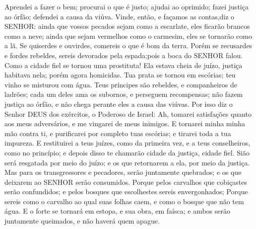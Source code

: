 {  Aprendei a fazer o bem; procurai o que é justo; ajudai ao oprimido; fazei justiça ao órfão; defendei a causa da viúva.
  Vinde, então, e façamos as contas,diz o SENHOR: ainda que vossos pecados sejam como a escarlate, eles ficarão brancos como a neve; ainda que sejam vermelhos como o carmesim, eles se tornarão como a lã.
  Se quiserdes e ouvirdes, comereis o que é bom da terra.
  Porém se recusardes e fordes rebeldes, sereis devorados pela espada;pois
{} a boca do SENHOR falou.
  Como a cidade fiel se tornou uma prostituta! Ela estava cheia de juízo, justiça habitava nela; porém agora homicidas.
  Tua prata se tornou em escórias; teu vinho se misturou com água.
  Teus príncipes são rebeldes, e companheiros de ladrões; cada um deles ama os subornos, e perseguem recompensas; não fazem justiça ao órfão, e não chega perante eles a causa das viúvas.
  Por isso diz o Senhor DEUS dos exércitos, o Poderoso de Israel: Ah, tomarei satisfações quanto aos meus adversários, e me vingarei de meus inimigos.
  E tornarei minha minha mão contra ti, e purificarei por completo tuas escórias; e tirarei toda a tua impureza.
  E restituirei a teus juízes, como da primeira vez, e a teus conselheiros, como no princípio; e depois disso te chamarão cidade da justiça, cidade fiel.
  Sião será resgatada por meio do juízo; e os que retornarem a ela, por meio da justiça.
  Mas para os transgressores e pecadores, serão juntamente quebrados; e os que deixarem ao SENHOR serão consumidos.
  Porque pelos carvalhos que cobiçastes serão confundidos; e pelos bosques que escolhestes sereis envergonhados;
  Porque sereis como o carvalho ao qual suas folhas caem, e como o bosque que não tem água.
  E o forte se tornará em estopa, e sua obra, em faísca; e ambos serão juntamente queimados, e não haverá quem
{} apague.
\par }

